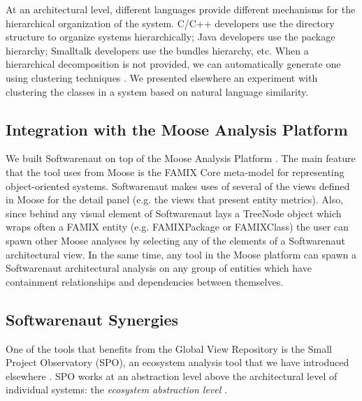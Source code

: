 \documentclass[preprint,12pt]{elsarticle}
\begin{document}
At an architectural level, different languages provide different mechanisms for the hierarchical organization of the system. C/C++ developers use the directory structure to organize systems hierarchically; Java developers use the package hierarchy; Smalltalk developers use the bundles hierarchy, etc. 
When a hierarchical decomposition is not provided, we can automatically generate one using clustering techniques \cite{koschke-thesis}. We presented elsewhere an experiment with clustering the classes in a system based on natural language similarity\cite{Lung05a}.



\subsection {Integration with the Moose Analysis Platform}
We built Softwarenaut on top of the Moose Analysis Platform \cite{nier-story}. The main feature that the tool uses from Moose is the FAMIX Core meta-model for representing object-oriented systems. 
Softwarenaut makes uses of several of the views defined in Moose for the detail panel (e.g. the views that present entity metrics). Also, since behind any visual element of Softwarenaut lays a TreeNode object which wraps often a FAMIX entity (e.g. FAMIXPackage or FAMIXClass) the user can spawn other Moose analyses by selecting any of the elements of a Softwarenaut architectural view. In the same time, any tool in the Moose platform can spawn a Softwarenaut architectural analysis on any group of entities which have containment relationships and dependencies between themselves.





\subsection {Softwarenaut Synergies}
One of the tools that benefits from the Global View Repository is the Small Project Observatory (SPO), an ecosystem analysis tool that we have introduced elsewhere \cite{lungu-est}. SPO works at an abstraction level above the architectural level of individual systems: the {\em ecosystem abstraction level} \cite{lungu-thesis}. 
\end{document}
